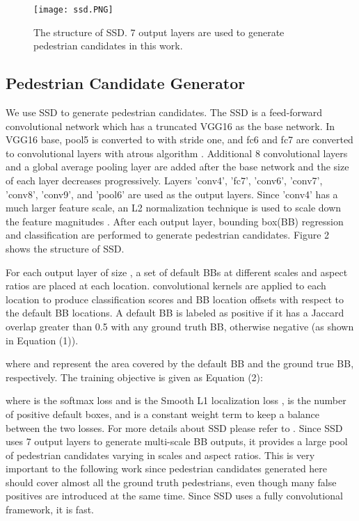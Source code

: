 \documentclass[10pt,letterpaper]{article}
\begin{document}
\begin{figure*}
\begin{center}
   \texttt{[image: ssd.PNG]}
\end{center}
   \caption{The structure of SSD. 7 output layers are used to generate pedestrian candidates in this work.}
\label{fig:short}
\end{figure*}

\subsection{Pedestrian Candidate Generator}
We use SSD to generate pedestrian candidates. The SSD is a feed-forward convolutional network which has a truncated VGG16 as the base network. In VGG16 base, pool5 is converted to  with stride one, and fc6 and fc7 are converted to convolutional layers with atrous algorithm \cite{sspaper}. Additional 8 convolutional layers and a global average pooling layer are added after the base network and the size of each layer decreases progressively. Layers 'conv4', 'fc7', 'conv6', 'conv7', 'conv8', 'conv9', and 'pool6' are used as the output layers. Since 'conv4' has a much larger feature scale, an L2 normalization technique is used to scale down the feature magnitudes \cite{ParseNetLW}. After each output layer, bounding box(BB) regression and classification are performed  to generate pedestrian candidates. Figure 2 shows the structure of SSD.

For each output layer of size , a set of default BBs at different scales and aspect ratios are placed at each location.  convolutional kernels are applied to each location to produce classification scores and BB location offsets with respect to the default BB locations. A default BB is labeled as positive if it has a Jaccard overlap greater than 0.5 with any ground truth BB, otherwise negative (as shown in Equation (1)).  

where  and  represent the area covered by the default BB and the ground true BB, respectively. The training objective is given as Equation (2):

where  is the softmax loss and  is the Smooth L1 localization loss \cite{fastrcnn},  is the number of positive default boxes, and  is a constant weight term to keep a balance between the two losses. For more details about SSD please refer to \cite{SSD}. Since SSD uses 7 output layers to generate multi-scale BB outputs, it provides a large pool of pedestrian candidates varying in scales and aspect ratios. This is very important to the following work since pedestrian candidates generated here should cover almost all the ground truth pedestrians, even though many false positives are introduced at the same time. Since SSD uses a fully convolutional framework, it is fast.
\end{document}
